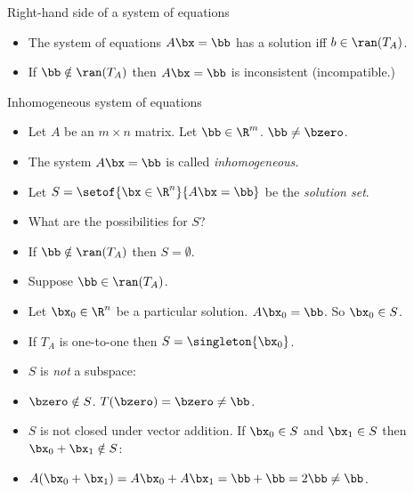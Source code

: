 \documentclass{beamer}
\begin{document}

\begin{frame}{Right-hand side of a system of equations}

\begin{itemize}
\item The system of equations $A\bx=\bb$ has a solution iff $b\in\ran(T_A)$.
\item If $\bb\notin\ran(T_A)$ then $A\bx=\bb$ is inconsistent (incompatible.)
\end{itemize}

\end{frame}


\begin{frame}{Inhomogeneous system of equations}

\begin{itemize}
\item Let $A$ be an $m\times n$ matrix. Let $\bb\in\R^m$. $\bb\not=\bzero$.
\item The system $A\bx=\bb$ is called \emph{inhomogeneous.}
\item Let $S=\setof{\bx \in \R^n}{A \bx = \bb}$ be the \emph{solution set}.
\item What are the possibilities for $S$?
\item If $\bb\notin\ran(T_A)$ then $S=\emptyset$.
\item Suppose $\bb\in\ran(T_A)$.
\item Let $\bx_0\in\R^n$ be a particular solution. $A\bx_0=\bb$. So $\bx_0\in S$.
\item If $T_A$ is one-to-one then $S=\singleton{\bx_0}$.
\item $S$ is \emph{not} a subspace:
\item $\bzero\notin S$. $T(\bzero) = \bzero \not= \bb$.
\item $S$ is not closed under vector addition. If $\bx_0\in S$ and $\bx_1\in S$
then $\bx_0+\bx_1\notin S$:
\item $A(\bx_0+\bx_1) = A\bx_0+A\bx_1 = \bb+\bb = 2\bb \not= \bb$.
\end{itemize}

\end{frame}


\end{document}
